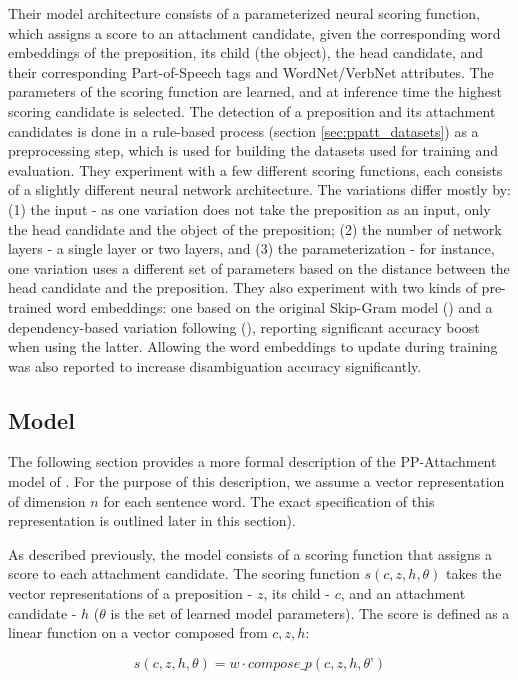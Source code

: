 Their model architecture consists of a parameterized neural scoring function, which assigns a score to an attachment candidate, given the corresponding word embeddings of the preposition, its child (the object), the head candidate, and their corresponding Part-of-Speech tags and WordNet/VerbNet attributes. The parameters of the scoring function are learned, and at inference time the highest scoring candidate is selected. The detection of a preposition and its attachment candidates is done in a rule-based process (section \ref{sec:ppatt_datasets}) as a preprocessing step, which is used for building the datasets used for training and evaluation. They experiment with a few different scoring functions, each consists of a slightly different neural network architecture. The variations differ mostly by: (1)  the input - as one variation does not take the preposition as an input, only the head candidate and the object of the preposition; (2) the number of network layers - a single layer or two layers, and (3) the parameterization - for instance, one variation uses a different set of parameters based on the distance between the head candidate and the preposition. They also experiment with two kinds of pre-trained word embeddings: one based on the original Skip-Gram model (\cite{word2vec}) and a dependency-based variation following (\cite{bansal}), reporting significant accuracy boost when using the latter. Allowing the word embeddings to update during training was also reported to increase disambiguation accuracy significantly. 

\subsection{Model}
The following section provides a more formal description of the PP-Attachment model of \cite{hpcd}. For the purpose of this description, we assume a vector representation of dimension $n$ for each sentence word. The exact specification of this representation is outlined later in this section).

As described previously, the model consists of a scoring function that assigns a score to each attachment candidate. The scoring function $s(c, z, h, \theta)$ takes the vector representations of a preposition  - $z$, its child - $c$, and an attachment candidate - $h$ ($\theta$ is the set of learned model parameters). The score is defined as a linear function on a vector composed from $c, z, h$:

$$s(c,z,h,\theta) = w \cdot compose\_p(c,z,h, \theta’)$$

